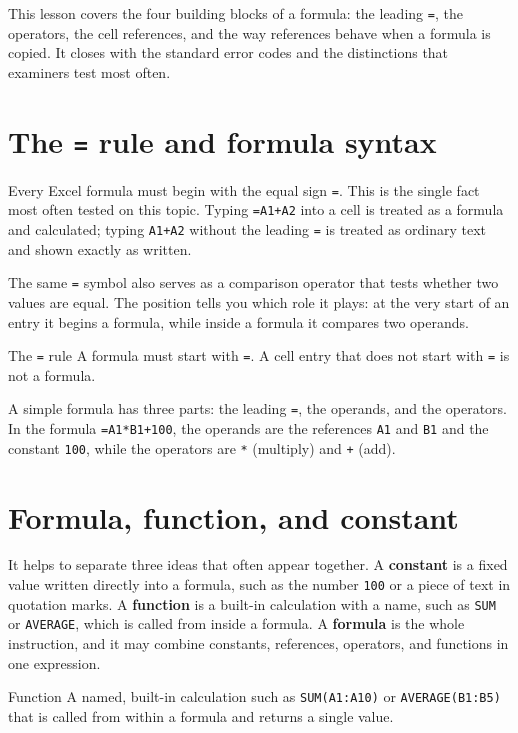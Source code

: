 This lesson covers the four building blocks of a formula: the leading
\texttt{=}, the operators, the cell references, and the way references behave
when a formula is copied. It closes with the standard error codes and the
distinctions that examiners test most often.

\section{The \texttt{=} rule and formula syntax}
Every Excel formula must begin with the equal sign \texttt{=}. This is the
single fact most often tested on this topic. Typing \texttt{=A1+A2} into a
cell is treated as a formula and calculated; typing \texttt{A1+A2} without the
leading \texttt{=} is treated as ordinary text and shown exactly as written.

The same \texttt{=} symbol also serves as a comparison operator that tests
whether two values are equal. The position tells you which role it plays: at
the very start of an entry it begins a formula, while inside a formula it
compares two operands.

\begin{definitionbox}{The \texttt{=} rule}
A formula must start with \texttt{=}. A cell entry that does not start with
\texttt{=} is not a formula.
\end{definitionbox}

A simple formula has three parts: the leading \texttt{=}, the operands, and
the operators. In the formula \texttt{=A1*B1+100}, the operands are the
references \texttt{A1} and \texttt{B1} and the constant \texttt{100}, while
the operators are \texttt{*} (multiply) and \texttt{+} (add).

\section{Formula, function, and constant}
It helps to separate three ideas that often appear together. A
\textbf{constant} is a fixed value written directly into a formula, such as
the number \texttt{100} or a piece of text in quotation marks. A
\textbf{function} is a built-in calculation with a name, such as
\texttt{SUM} or \texttt{AVERAGE}, which is called from inside a formula. A
\textbf{formula} is the whole instruction, and it may combine constants,
references, operators, and functions in one expression.

\begin{definitionbox}{Function}
A named, built-in calculation such as \texttt{SUM(A1:A10)} or
\texttt{AVERAGE(B1:B5)} that is called from within a formula and returns a
single value.
\end{definitionbox}

